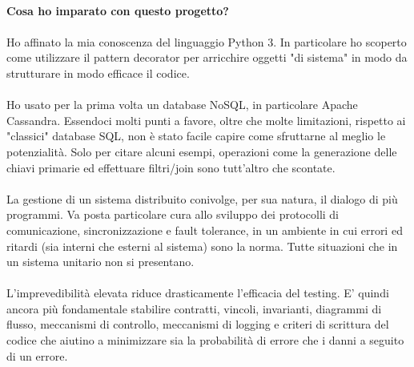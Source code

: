 \documentclass{article}
\begin{document}
\paragraph{Cosa ho imparato con questo progetto?}

\paragraph{} Ho affinato la mia conoscenza del linguaggio Python 3. In particolare ho scoperto come utilizzare il pattern decorator per arricchire oggetti "di sistema" in modo da strutturare in modo efficace il codice. 

\paragraph{} Ho usato per la prima volta un database NoSQL, in particolare Apache Cassandra. Essendoci molti punti a favore, oltre che molte limitazioni, rispetto ai "classici" database SQL, non è stato facile capire come sfruttarne al meglio le potenzialità. Solo per citare alcuni esempi, operazioni come la generazione delle chiavi primarie ed effettuare filtri/join sono tutt'altro che scontate. 

\paragraph{} La gestione di un sistema distribuito conivolge, per sua natura, il dialogo di più programmi. Va posta particolare cura allo sviluppo dei protocolli di comunicazione, sincronizzazione e fault tolerance, in un ambiente in cui errori ed ritardi (sia interni che esterni al sistema) sono la norma. Tutte situazioni che in un sistema unitario non si presentano. 

\paragraph{} L'imprevedibilità elevata riduce drasticamente l'efficacia del testing. E' quindi ancora più fondamentale stabilire contratti, vincoli, invarianti, diagrammi di flusso, meccanismi di controllo, meccanismi di logging e criteri di scrittura del codice che aiutino a minimizzare sia la probabilità di errore che i danni a seguito di un errore. 



\end{document}
